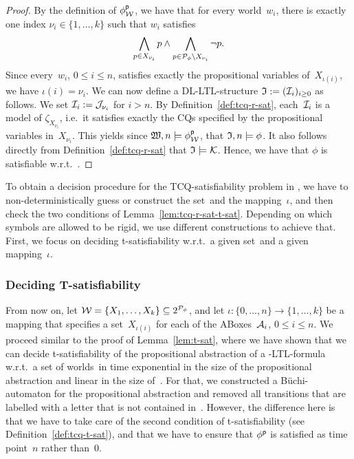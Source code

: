 \begin{proof}
    By the definition of $\phi^\mathsf{p}_\mathcal{W}$, we have that for
    every world~$w_i$, there is exactly one index $\nu_i\in\{1,\dots,k\}$ such
    that $w_i$ satisfies
    \[\bigwedge_{p\in X_{\nu_i}}p\land\bigwedge_{p\in\mathcal{P}_\phi\setminus X_{\nu_i}}\lnot p.\]
    Since every~$w_i$, $0\le i\le n$, satisfies exactly the propositional
    variables of~$X_{\iota(i)}$, we have $\iota(i)=\nu_i$.
    We can now define a DL-LTL-structure $\mathfrak{I}:=(\mathcal{I}_i)_{i\ge 0}$ as follows.
    We set $\mathcal{I}_i:=\mathcal{J}_{\nu_i}$ for $i>n$.  By Definition~\ref{def:tcq-r-sat},
    each~$\mathcal{I}_i$ is a model of $\zeta_{X_{\nu_i}}$, i.e.~it satisfies exactly
    the CQs specified by the propositional variables in~$X_{\nu_i}$.  This
    yields since $\mathfrak{W},n\models\phi^\mathsf{p}_\mathcal{W}$, that $\mathfrak{I},n\models\phi$.  It
    also follows directly from Definition~\ref{def:tcq-r-sat} that
    $\mathfrak{I}\models\mathcal{K}$.  Hence, we have that $\phi$ is satisfiable w.r.t.~\Kmc.
\end{proof}

\noindent
To obtain a decision procedure for the TCQ-satisfiability problem in \SHQ, we
have to non-deterministically guess or construct the set~\Wmc and the
mapping~$\iota$, and then check the two conditions of
Lemma~\ref{lem:tcq-r-sat-t-sat}.
%
Depending on which symbols are allowed to be rigid, we use different
constructions to achieve that.
%
First, we focus on deciding t-satisfiability w.r.t.\ a given set~\Wmc and a
given mapping~$\iota$.


\subsubsection{Deciding T-satisfiability}

From now on, let $\mathcal{W}=\{X_1,\dots,X_k\}\subseteq 2^{\mathcal{P}_\phi}$, and let
$\iota\colon\{0,\dots,n\}\to\{1,\dots,k\}$ be a mapping that specifies a
set~$X_{\iota(i)}$ for each of the ABoxes~$\mathcal{A}_i$, $0\le i\le n$.
%
We proceed similar to the proof of Lemma~\ref{lem:t-sat}, where we have shown
that we can decide t-satisfiability of the propositional abstraction of a
\SHOQ-LTL-formula w.r.t.\ a set of worlds~\Wmc in time exponential in the size
of the propositional abstraction and linear in the size of~\Wmc.  For that, we
constructed a Büchi-automaton for the propositional abstraction and removed all
transitions that are labelled with a letter that is not contained in~\Wmc.
However, the difference here is that we have to take care of the second
condition of t-satisfiability (see Definition~\ref{def:tcq-t-sat}), and that we
have to ensure that $\phi^\mathsf{p}$ is satisfied as time point~$n$ rather than~$0$.


